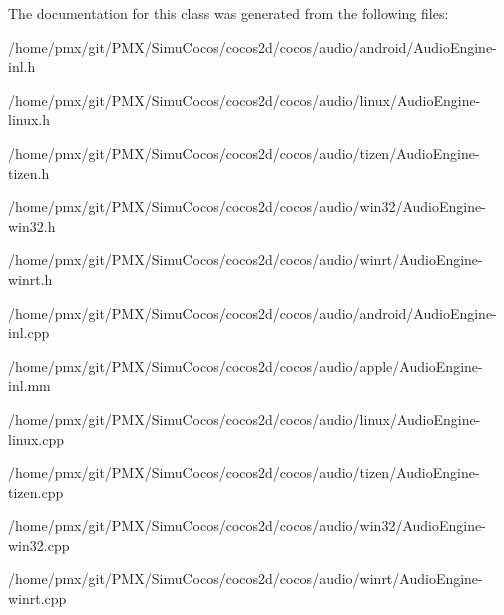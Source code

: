The documentation for this class was generated from the following files\+:\begin{DoxyCompactItemize}
\item 
/home/pmx/git/\+P\+M\+X/\+Simu\+Cocos/cocos2d/cocos/audio/android/Audio\+Engine-\/inl.\+h\item 
/home/pmx/git/\+P\+M\+X/\+Simu\+Cocos/cocos2d/cocos/audio/linux/Audio\+Engine-\/linux.\+h\item 
/home/pmx/git/\+P\+M\+X/\+Simu\+Cocos/cocos2d/cocos/audio/tizen/Audio\+Engine-\/tizen.\+h\item 
/home/pmx/git/\+P\+M\+X/\+Simu\+Cocos/cocos2d/cocos/audio/win32/Audio\+Engine-\/win32.\+h\item 
/home/pmx/git/\+P\+M\+X/\+Simu\+Cocos/cocos2d/cocos/audio/winrt/Audio\+Engine-\/winrt.\+h\item 
/home/pmx/git/\+P\+M\+X/\+Simu\+Cocos/cocos2d/cocos/audio/android/Audio\+Engine-\/inl.\+cpp\item 
/home/pmx/git/\+P\+M\+X/\+Simu\+Cocos/cocos2d/cocos/audio/apple/Audio\+Engine-\/inl.\+mm\item 
/home/pmx/git/\+P\+M\+X/\+Simu\+Cocos/cocos2d/cocos/audio/linux/Audio\+Engine-\/linux.\+cpp\item 
/home/pmx/git/\+P\+M\+X/\+Simu\+Cocos/cocos2d/cocos/audio/tizen/Audio\+Engine-\/tizen.\+cpp\item 
/home/pmx/git/\+P\+M\+X/\+Simu\+Cocos/cocos2d/cocos/audio/win32/Audio\+Engine-\/win32.\+cpp\item 
/home/pmx/git/\+P\+M\+X/\+Simu\+Cocos/cocos2d/cocos/audio/winrt/Audio\+Engine-\/winrt.\+cpp\end{DoxyCompactItemize}
